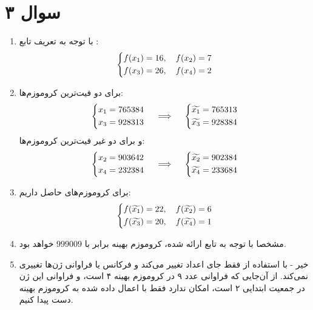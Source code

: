 \documentclass[a4paper, 12pt]{article}
\begin{document}
\section*{سوال ۳}
\begin{enumerate}[آ)]
	\item
	با توجه به تعریف تابع :
	\[
	\begin{dcases}
		f(x_1) = 16, \quad f(x_2) = 7 \\
		f(x_3) = 26, \quad f(x_4) = 2
	\end{dcases}
	\]
	\item
	برای دو فیت‌ترین کروموزم‌ها:
	\[
	\begin{dcases}
		x_1 = 765384 \\
		x_3 = 928313
	\end{dcases}
	\quad\implies\quad
	\begin{dcases}
		\widetilde{x_1} = 765313\\
		\widetilde{x_3} = 928384
	\end{dcases} 
	\]
	و برای دو غیر فیت‌ترین کروموزم‌ها:
	\[
	\begin{dcases}
		x_2 = 903642 \\
		x_4 = 232384
	\end{dcases}
	\quad\implies\quad
	\begin{dcases}
		\widetilde{x_2} = 902384 \\
		\widetilde{x_4} = 233684
	\end{dcases}
	\]
	\item
	برای کروموزم‌های حاصل داریم:
	\[
	\begin{dcases}
		f(\widetilde{x_1}) = 22, \quad f(\widetilde{x_2}) = 6 \\
		f(\widetilde{x_3}) = 20, \quad f(\widetilde{x_4}) = 1 \\
	\end{dcases}
	\]
	\item
	مشخصا با توجه به تابع  ارائه شده، کروموزم بهینه برابر با $999009$ خواهد بود.
	\item
	خیر - با استفاده از  فقط جای اعداد تغییر می‌کند و فرکانس یا فراوانی ژن‌ها تغییری نمی‌کند. از آن‌جایی که فراوانی عدد ۹ در کروموزم بهینه ۴ است، و فراوانی این ژن در جمعیت ابتدایی ۲ است، امکان ندارد فقط با اعمال  داده شده به کروموزم بهینه دست پیدا کنیم.
\end{enumerate}
	
\end{document}
